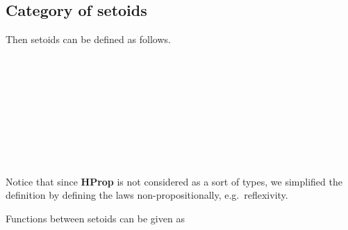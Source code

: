 \subsection{Category of setoids}

Then setoids can be defined as follows.

\begin{code}\>\<%
\\
\>  \AgdaSymbol{:}  \<%
\\
\>[0]\<[2]%
\>[2]\<%
\\
\>[2]\<[4]%
\>[4] \AgdaSymbol{:} \<%
\\
\>[2]\<[4]%
\>[4] \<[13]%
\>[13]\AgdaSymbol{:}     \<%
\\
\>[2]\<[4]%
\>[4] \<[12]%
\>[12]\AgdaSymbol{:} \AgdaSymbol{\{} \AgdaSymbol{:} \AgdaSymbol{\}}  \AgdaFunction{<}    \AgdaFunction{>}\<%
\\
\>[2]\<[4]%
\>[4] \<[12]%
\>[12]\AgdaSymbol{:} \AgdaSymbol{\{}  \AgdaSymbol{:} \AgdaSymbol{\}}  \AgdaFunction{<}    \AgdaFunction{>}  \AgdaFunction{<}    \AgdaFunction{>}\<%
\\
\>[2]\<[4]%
\>[4] \<[12]%
\>[12]\AgdaSymbol{:} \AgdaSymbol{\{}   \AgdaSymbol{:} \AgdaSymbol{\}}  \AgdaFunction{<}    \AgdaFunction{>}  \AgdaFunction{<}    \AgdaFunction{>}  \AgdaFunction{<}    \AgdaFunction{>}\<%
\\
\>\<\end{code}

Notice that since \textbf{HProp} is not considered as a sort of types, we simplified the definition by defining the laws non-propositionally, e.g.\ reflexivity.



Functions between setoids can be given as

